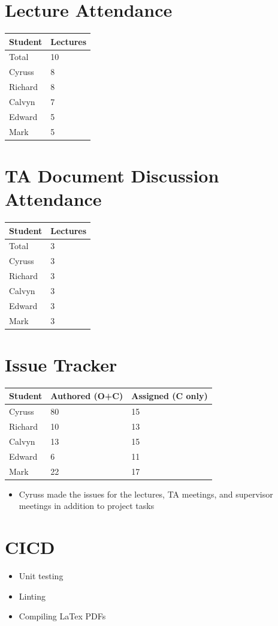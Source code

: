 \documentclass{article}
\begin{document}
\section{Lecture Attendance}

\begin{table}[H]
\centering
\begin{tabular}{ll}
\toprule
\textbf{Student} & \textbf{Lectures}\\
\midrule
Total & 10\\
Cyruss & 8\\
Richard & 8\\
Calvyn & 7\\
Edward & 5\\
Mark & 5\\
\bottomrule
\end{tabular}
\end{table}

\section{TA Document Discussion Attendance}

\begin{table}[H]
\centering
\begin{tabular}{ll}
\toprule
\textbf{Student} & \textbf{Lectures}\\
\midrule
Total & 3\\
Cyruss & 3\\
Richard & 3\\
Calvyn & 3\\
Edward & 3\\
Mark & 3\\
\bottomrule
\end{tabular}
\end{table}

\section{Issue Tracker}

\begin{table}[H]
\centering
\begin{tabular}{lll}
\toprule
\textbf{Student} & \textbf{Authored (O+C)} & \textbf{Assigned (C only)}\\
\midrule
Cyruss & 80 & 15 \\
Richard & 10 & 13 \\
Calvyn & 13 & 15 \\
Edward & 6 & 11 \\
Mark & 22 & 17 \\
\bottomrule
\end{tabular}
\end{table}

\begin{itemize}
    \item Cyruss made the issues for the lectures, TA meetings, and supervisor meetings in addition to project tasks
\end{itemize}

\section{CICD}

\begin{itemize}
    \item Unit testing
    \item Linting
    \item Compiling LaTex PDFs
\end{itemize}
\end{document}
